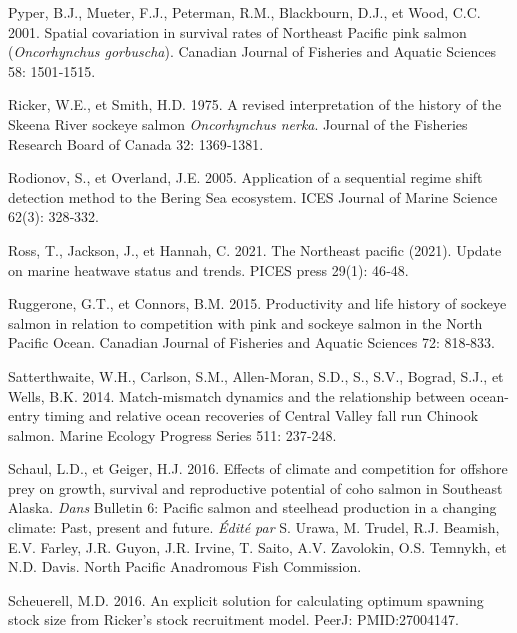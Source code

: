 \documentclass[french,11pt]{book}
\begin{document}
\begin{CSLReferences}{1}{0}
Pyper, B.J., Mueter, F.J., Peterman, R.M., Blackbourn, D.J., et Wood, C.C. 2001. {Spatial covariation in survival rates of Northeast Pacific pink salmon (}\emph{Oncorhynchus gorbuscha}{)}. Canadian Journal of Fisheries and Aquatic Sciences 58: 1501‑1515.

Ricker, W.E., et Smith, H.D. 1975. A revised interpretation of the history of the {S}keena {R}iver sockeye salmon \emph{Oncorhynchus nerka}. Journal of the Fisheries Research Board of Canada 32: 1369‑1381.

Rodionov, S., et Overland, J.E. 2005. {Application of a sequential regime shift detection method to the Bering Sea ecosystem}. ICES Journal of Marine Science 62(3): 328‑332.

Ross, T., Jackson, J., et Hannah, C. 2021. {The Northeast pacific (2021). Update on marine heatwave status and trends}. {PICES press} 29(1): 46‑48.

Ruggerone, G.T., et Connors, B.M. 2015. {Productivity and life history of sockeye salmon in relation to competition with pink and sockeye salmon in the North Pacific Ocean}. Canadian Journal of Fisheries and Aquatic Sciences 72: 818‑833.

Satterthwaite, W.H., Carlson, S.M., Allen-Moran, S.D., S., S.V., Bograd, S.J., et Wells, B.K. 2014. {Match-mismatch dynamics and the relationship between ocean-entry timing and relative ocean recoveries of Central Valley fall run Chinook salmon}. Marine Ecology Progress Series 511: 237‑248.

Schaul, L.D., et Geiger, H.J. 2016. {Effects of climate and competition for offshore prey on growth, survival and reproductive potential of coho salmon in Southeast Alaska}. \emph{Dans} Bulletin 6: Pacific salmon and steelhead production in a changing climate: Past, present and future. \emph{Édité par} S. Urawa, M. Trudel, R.J. Beamish, E.V. Farley, J.R. Guyon, J.R. Irvine, T. Saito, A.V. Zavolokin, O.S. Temnykh, et N.D. Davis. North Pacific Anadromous Fish Commission.

Scheuerell, M.D. 2016. {An explicit solution for calculating optimum spawning stock size from Ricker's stock recruitment model}. {PeerJ}: PMID:27004147.


\end{CSLReferences}
\end{document}
